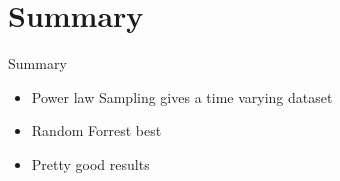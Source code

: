 \documentclass{beamer}
\begin{document}
\section*{Summary}

\begin{frame}{Summary}
  \begin{itemize}
\item Power law Sampling gives a time varying dataset
\item Random Forrest best
\item Pretty good results

  \end{itemize}
\end{frame}
\end{document}
